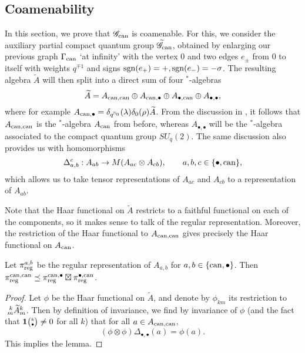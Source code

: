 \subsection{Coamenability}

In this section, we prove that $\mathscr{G}_{\can}$ is coamenable. For this, we consider the auxiliary partial compact quantum group $\widetilde{\mathscr{G}}_{\can}$, obtained by enlarging our previous graph $\Gamma_{\can}$ `at infinity' with the vertex $0$ and two edges $e_{\pm}$ from 0 to itself with weights $q^{\mp 1}$ and signs $\sgn(e_+)=+,\sgn(e_-)=-\sigma$. The resulting algebra $\widetilde{A}$ will then split into a direct sum of four $^*$-algebras \[\widetilde{A} = A_{\can,\can} \oplus A_{\can,\bullet} \oplus A_{\bullet,\can} \oplus A_{\bullet,\bullet},\] where for example $A_{\can,\bullet} = \delta_{q^{\N_0}}(\lambda)\delta_0(\rho) \widetilde{A}$. From the discussion in \cite[Section 4.2]{DCT1}, it follows that $A_{\can,\can}$ is the $^*$-algebra $A_{\can}$ from before, whereas $A_{\bullet,\bullet}$ will be the $^*$-algebra associated to the compact quantum group $SU_q(2)$. The same discussion also provides us with homomorphisms \[\Delta_{a,b}^c: A_{ab}\rightarrow M(A_{ac}\otimes A_{cb}),\qquad a,b,c \in \{\bullet,\can\},\] which allows us to take tensor representations of $A_{ac}$ and $A_{cb}$ to a representation of $A_{ab}$.

Note that the Haar functional on $\widetilde{A}$ restricts to a faithful functional on each of the components, so it makes sense to talk of the regular representation. Moreover, the restriction of the Haar functional to $A_{\can,\can}$ gives precisely the Haar functional on $A_{\can}$.

\begin{Lem} Let $\pi_{\reg}^{a,b}$ be the regular representation of $A_{a,b}$ for $a,b\in \{\can,\bullet\}$. Then $\pi_{\reg}^{\can,\can} \preceq \pi_{\reg}^{\can,\bullet}\boxtimes \pi_{\reg}^{\bullet,\can}$. 
\end{Lem} 

\begin{proof} Let $\phi$ be the Haar functional on $\widetilde{A}$, and denote by $\phi_{km}$ its restriction to $\gr{\widetilde{A}}{k}{k}{m}{m}$. Then by definition of invariance, we find by invariance of $\phi$ (and the fact that $\UnitC{k}{\bullet}\neq 0$ for all $k$) that for all $a\in A_{\can,\can}$, \[(\phi\otimes \phi)\Delta_{\bullet,\bullet}(a) = \phi(a).\] This implies the lemma.
\end{proof}


